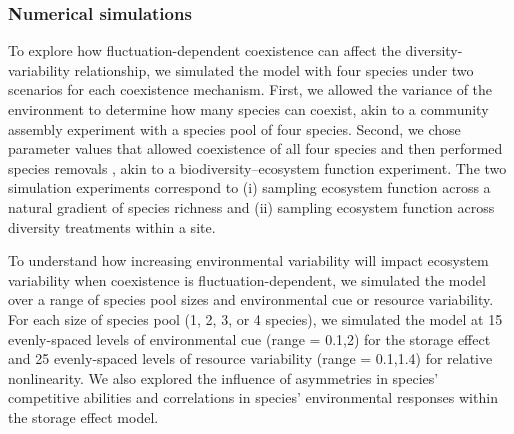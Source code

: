 \documentclass[12pt,]{article}
\begin{document}
\subsubsection{Numerical simulations}\label{numerical-simulations}

To explore how fluctuation-dependent coexistence can affect the
diversity-variability relationship, we simulated the model with four
species under two scenarios for each coexistence mechanism. First, we
allowed the variance of the environment to determine how many species
can coexist, akin to a community assembly experiment with a species pool
of four species.
Second, we chose parameter values that allowed coexistence of all four
species and then performed species removals
, akin to a
biodiversity--ecosystem function experiment. The two simulation
experiments correspond to (i) sampling ecosystem function across a
natural gradient of species richness and (ii) sampling ecosystem
function across diversity treatments within a site.

To understand how increasing environmental variability will impact
ecosystem variability when coexistence is fluctuation-dependent, we
simulated the model over a range of species pool sizes and environmental
cue or resource variability. For each size of species pool (1, 2, 3, or
4 species), we simulated the model at 15 evenly-spaced levels of
environmental cue (range = 0.1,2) for the storage effect and 25
evenly-spaced levels of resource variability (range = 0.1,1.4) for
relative nonlinearity. We also explored the influence of asymmetries in
species' competitive abilities and correlations in species'
environmental responses within the storage effect model.
\end{document}
